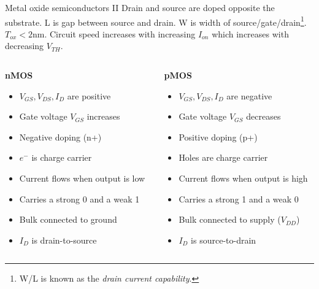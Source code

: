 \documentclass[mathserif,xcolor={dvipsnames,table}]{beamer}
\begin{document}
\begin{frame}{Metal oxide semiconductors II}
Drain and source are doped opposite the substrate. L is gap between source and
drain. W is width of source/gate/drain\footnote{\tiny{W/L is known as the \textit{drain current capability}.}}.
$T_{ox} < 2$nm. Circuit speed increases with increasing $I_{on}$ which increases with decreasing $V_{TH}$.
\vfill
\begin{columns}
\begin{column}{.5\paperwidth}
\center \textbf{nMOS}
\begin{itemize}
\item $V_{GS}, V_{DS}, I_{D}$ are positive
\item Gate voltage $V_{GS}$ increases
\item Negative doping (n+)
\item $e^{-}$ is charge carrier
\item Current flows when output is low
\item Carries a strong 0 and a weak 1
\item Bulk connected to ground
\item $I_{D}$ is drain-to-source
\end{itemize}
\end{column}
\begin{column}{.5\paperwidth}
\center \textbf{pMOS}
\begin{itemize}
\item $V_{GS}, V_{DS}, I_{D}$ are negative
\item Gate voltage $V_{GS}$ decreases
\item Positive doping (p+)
\item Holes are charge carrier
\item Current flows when output is high
\item Carries a strong 1 and a weak 0
\item Bulk connected to supply ($V_{DD}$)
\item $I_{D}$ is source-to-drain
\end{itemize}
\end{column}
\end{columns}
\end{frame}
\end{document}

